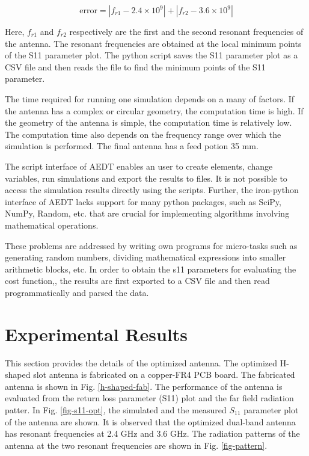 \begin{equation}\label{dual_cost}
\text{error}=\left|f_{r1}-2.4\times10^9\right|+\left|f_{r2}-3.6\times10^9\right|
\end{equation}

Here, $f_{r1}$ and $f_{r2}$ respectively are the first and the second resonant frequencies of the antenna. The resonant frequencies are obtained at the local minimum points of the S11 parameter plot. The python script saves the S11 parameter plot as a CSV file and then reads the file to find the minimum points of the S11 parameter.

The time required for running one simulation depends on a many of factors. If the antenna has a complex or circular geometry, the computation time is high. If the geometry of the antenna is simple, the computation time is relatively low. The computation time also depends on the frequency range over which the simulation is performed. The final antenna has a feed potion 35 mm.

The script interface of AEDT enables an user to create elements, change variables, run simulations and export the results to files. It is not possible to access the simulation results directly using the scripts. Further, the iron-python interface of AEDT lacks support for many python packages, such as SciPy, NumPy, Random, etc. that are crucial for implementing algorithms involving mathematical operations.

These problems are addressed by writing own programs for micro-tasks such as generating random numbers, dividing mathematical expressions into smaller arithmetic blocks, etc. In order to obtain the s11 parameters for evaluating the cost function,, the results are first exported to a CSV file and then read programmatically and parsed the data.

\section{Experimental Results} \label{c3sec_expt-res}
This section provides the details of the optimized antenna. The optimized H-shaped slot antenna is fabricated on a copper-FR4 PCB board. The fabricated antenna is shown in Fig. \ref{h-shaped-fab}. The performance of the antenna is evaluated from the return loss parameter (S11) plot and the far field radiation patter. In Fig. \ref{fig-s11-opt}, the simulated and the measured $S_{11}$ parameter plot of the antenna are shown. It is observed that the optimized dual-band antenna has resonant frequencies at 2.4 GHz and 3.6 GHz. The radiation patterns of the antenna at the two resonant frequencies are shown in Fig. \ref{fig-pattern}.


